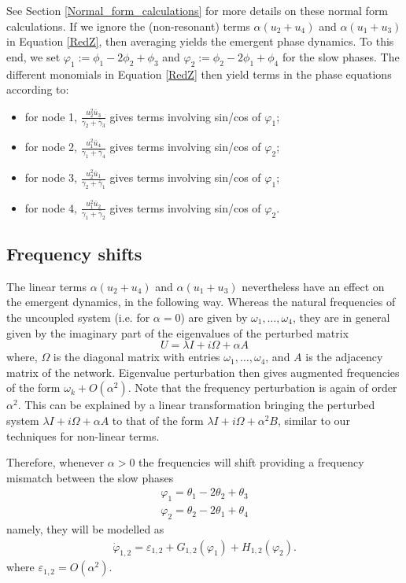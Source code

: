 \documentclass[12pt]{article}
\theoremstyle{plain}
\theoremstyle{definition}
\theoremstyle{remark}
\theoremstyle{remark}
\begin{document}
{See Section \ref{Normal_form_calculations} for more details on these normal form calculations. If we ignore the (non-resonant) terms  $\alpha(u_2 + u_4)$ and $\alpha(u_1 + u_3)$ in Equation \eqref{RedZ}, then averaging yields the emergent phase dynamics. To this end, we set $\varphi_1 := \phi_1-2\phi_2+\phi_3$ and $\varphi_2 := \phi_2-2\phi_1+\phi_4$ for the slow phases. The different monomials in Equation \eqref{RedZ} then yield terms in the phase equations according to:
\begin{itemize}
\item for node 1,  $\frac{u_{2}^2\bar{u}_{3}}{\gamma_{2} + \bar{\gamma}_3}$ gives terms involving sin/cos of $\varphi_1$;
\item for node 2,  $\frac{u_{1}^2\bar{u}_{4}}{\gamma_{1} + \bar{\gamma}_4}$ gives terms involving sin/cos of $\varphi_2$;
\item for node 3,  $\frac{u_{2}^2\bar{u}_{1}}{\gamma_{2} + \bar{\gamma}_1}$ gives terms involving sin/cos of $\varphi_1$;
\item for node 4,  $\frac{u_{1}^2\bar{u}_{2}}{\gamma_{1} + \bar{\gamma}_2}$ gives terms involving sin/cos of $\varphi_2$.
\end{itemize}

\subsection{Frequency shifts}

The linear terms $\alpha(u_2 + u_4)$ and $\alpha(u_1 + u_3)$ nevertheless have an effect on the emergent dynamics, in the following way. Whereas the natural frequencies of the uncoupled system (i.e. for $\alpha = 0$) are given by $\omega_1, \dots, \omega_4$, they are in general given by the imaginary part of the eigenvalues of the perturbed matrix 
$$U = \lambda I + i\Omega + \alpha A$$ 
where, $\Omega$ is the diagonal matrix with entries $\omega_1, \dots, \omega_4$, and $A$ is the adjacency matrix of the network. Eigenvalue perturbation then gives augmented frequencies of the form $\omega_k + O(\alpha^2)$. Note that the frequency perturbation is again of order $\alpha^2$. This can be explained by a linear transformation bringing the perturbed system $\lambda I + i\Omega + \alpha A$ to that of the form $\lambda I + i\Omega + \alpha^2 B$, similar to our techniques for non-linear terms.

Therefore, whenever $\alpha>0$ the frequencies will shift providing a frequency mismatch between the slow phases 
\begin{align}
\varphi_1 = \theta_1 -2 \theta_2  +\theta_3\\
\varphi_2 = \theta_2 -2 \theta_1 + \theta_4
\end{align}
namely, they will be modelled as 
\begin{align}\label{eq:mf_fitting}
\dot{\varphi}_{1,2} = \varepsilon_{1,2} + G_{1,2}(\varphi_1) +H_{1,2}(\varphi_2).
\end{align}
where $\varepsilon_{1,2}=O(\alpha^2)$. 
}
\end{document}
